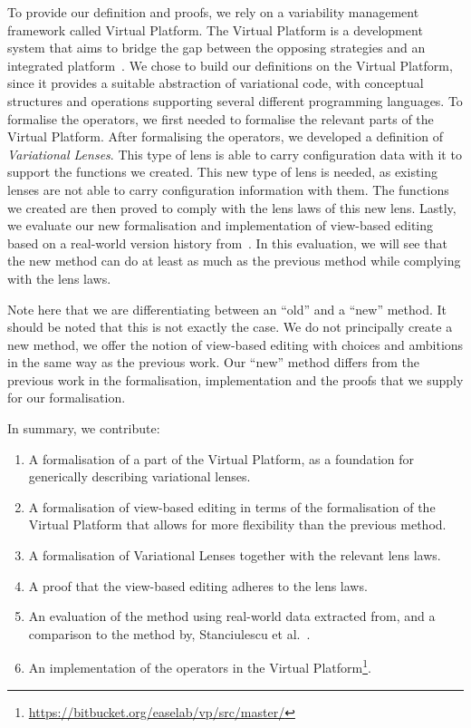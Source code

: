 To provide our definition and proofs, we rely on a variability management
framework called Virtual Platform. The Virtual Platform is a development system
that aims to bridge the gap between the opposing strategies \emph{\co} and
an integrated platform~\cite{mahmood2021}.
We chose to build our definitions on the Virtual Platform, since it provides a suitable abstraction of
variational code, with conceptual structures and operations supporting several 
different programming languages.
To formalise the operators, we first needed to formalise the relevant parts of the 
Virtual Platform. After formalising the operators, we developed a
definition of \emph{Variational Lenses}. This type of lens is able to carry
configuration data with it to support the functions we created. This new type of
lens is needed, as existing lenses are not able to carry configuration information
with them. The functions we created are then proved to comply with the lens laws 
of this new lens. Lastly, we evaluate our new formalisation and implementation of view-based editing
based on a real-world version history from~\cite{stuanciulescu2016}. In this evaluation,
we will see that the new method can do at least as much as the previous method
while complying with the lens laws. 

Note here that we are differentiating between an ``old'' and a ``new'' method. It
should be noted that this is not exactly the case. We do not principally create a new method,
we offer the notion of view-based editing with choices and ambitions in the same way as the
previous work. Our ``new'' method differs from the previous work in the formalisation, 
implementation and the proofs that we supply for our formalisation.

In summary, we contribute:
\begin{enumerate}
    \itemsep -.2em
    \item A formalisation of a part of the Virtual Platform, as a foundation for generically describing variational lenses.
    \item A formalisation of view-based editing in terms of the formalisation of the Virtual Platform that allows for more flexibility than the previous method.
    \item A formalisation of Variational Lenses together with the relevant lens laws.
    \item A proof that the view-based editing adheres to the lens laws.
    \item An evaluation of the method using real-world data extracted from, and a comparison to the method by, Stanciulescu et al.~\cite{stuanciulescu2016}.
    \item An implementation of the operators in the Virtual Platform\footnote{\url{https://bitbucket.org/easelab/vp/src/master/}}.
\end{enumerate}
